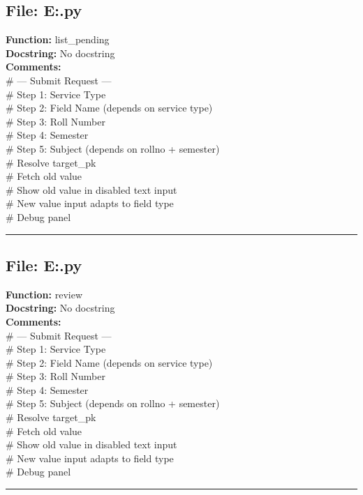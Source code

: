 {\subsection*{File: E:\project\capstone\frontend\faculty\request.py}
\textbf{Function:} list_pending\\
\textbf{Docstring:} No docstring\\
\textbf{Comments:}\\
# --- Submit Request ---\\
# Step 1: Service Type\\
# Step 2: Field Name (depends on service type)\\
# Step 3: Roll Number\\
# Step 4: Semester\\
# Step 5: Subject (depends on rollno + semester)\\
# Resolve target\_pk\\
# Fetch old value\\
# Show old value in disabled text input\\
# New value input adapts to field type\\
# Debug panel\\

\hrule

\subsection*{File: E:\project\capstone\frontend\faculty\request.py}
\textbf{Function:} review\\
\textbf{Docstring:} No docstring\\
\textbf{Comments:}\\
# --- Submit Request ---\\
# Step 1: Service Type\\
# Step 2: Field Name (depends on service type)\\
# Step 3: Roll Number\\
# Step 4: Semester\\
# Step 5: Subject (depends on rollno + semester)\\
# Resolve target\_pk\\
# Fetch old value\\
# Show old value in disabled text input\\
# New value input adapts to field type\\
# Debug panel\\

\hrule

}
